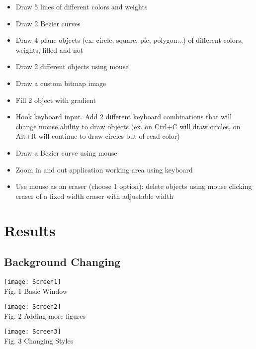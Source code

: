 \documentclass[12pt]{article}
\begin{document}
  \begin{itemize}
    \renewcommand{\labelitemi}{$\circ$}
    \item Draw 5 lines of different colors and weights
\item Draw 2 Bezier curves
\item Draw 4 plane objects (ex. circle, square, pie, polygon...) of different colors, weights, filled and not
\item Draw 2 different objects using mouse
\item Draw a custom bitmap image
\item Fill 2 object with gradient
\item Hook keyboard input. Add 2 different keyboard combinations that will change mouse ability to draw objects (ex. on Ctrl+C will draw circles, on Alt+R will continue to draw circles but of read color)
\item Draw a Bezier curve using mouse
\item Zoom in and out application working area using keyboard
\item Use mouse as an eraser (choose 1 option):
delete objects using mouse clicking eraser of a fixed width eraser with adjustable width
  \end{itemize}


  \section{Results}




\subsection{Background Changing}
\begin{minipage}[b]{1.0\linewidth}
      \begin{center}
        \texttt{[image: Screen1]}
         \\ Fig. 1 Basic Window
      \end{center}
    \end{minipage}

    \begin{minipage}[b]{1.0\linewidth}
      \begin{center}
        \texttt{[image: Screen2]}
         \\ Fig. 2 Adding more figures
      \end{center}
    \end{minipage}
    \begin{minipage}[b]{1.0\linewidth}
      \begin{center}
        \texttt{[image: Screen3]}
         \\ Fig. 3 Changing Styles
      \end{center}
    \end{minipage}
    
\end{document}
